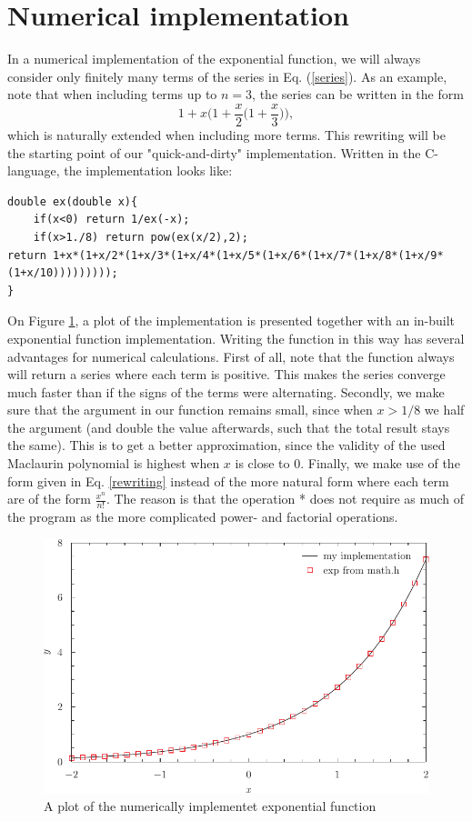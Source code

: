 \documentclass{article}
\begin{document}
\section{Numerical implementation}
In a numerical implementation of the exponential function, we will always consider only finitely many terms of the series in Eq. (\ref{series}). As an example, note that when including terms up to $n=3$, the series can be written in the form
\begin{equation}
1+x\bigg(1+\frac{x}{2}\bigg(1+\frac{x}{3}\bigg)\bigg),
	\label{rewriting}
\end{equation}
which is naturally extended when including more terms. This rewriting will be the starting point of our "quick-and-dirty" implementation. Written in the C-language, the implementation looks like:
\begin{lstlisting}
double ex(double x){
	if(x<0) return 1/ex(-x);
	if(x>1./8) return pow(ex(x/2),2);
return 1+x*(1+x/2*(1+x/3*(1+x/4*(1+x/5*(1+x/6*(1+x/7*(1+x/8*(1+x/9*(1+x/10)))))))));
}
\end{lstlisting}
On Figure \ref{plot}, a plot of the implementation is presented together with an in-built exponential function implementation. Writing the function in this way has several advantages for numerical calculations. First of all, note that the function always will return a series where each term is positive. This makes the series converge much faster than if the signs of the terms were alternating. Secondly, we make sure that the argument in our function remains small, since when $x>1/8$ we half the argument (and double the value afterwards, such that the total result stays the same). This is to get a better approximation, since the validity of the used Maclaurin polynomial is highest when $x$ is close to $0$. Finally, we make use of the form given in Eq. \ref{rewriting} instead of the more natural form where each term are of the form $\frac{x^n}{n!}$. The reason is that the operation * does not require as much of the program as the more complicated power- and factorial operations. 
\begin{figure}
\includegraphics{plot.pdf}
	\caption{A plot of the numerically implementet exponential function}
	\label{plot}
\end{figure}
\end{document}
